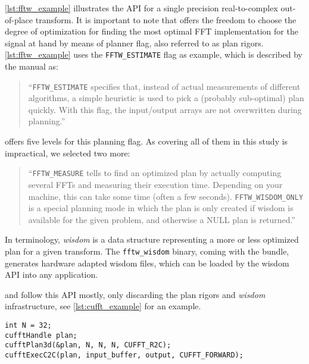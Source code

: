 \cref{lst:fftw_example} illustrates the \fftw{} API for a single precision real-to-complex out-of-place transform. It is important to note that \fftw{} offers the freedom to choose the degree of optimization for finding the most optimal FFT implementation for the signal at hand by means of planner flag, also referred to as plan rigors. \cref{lst:fftw_example} uses the \texttt{FFTW\_ESTIMATE} flag as example, which is described by the \fftw{} manual \cite{fftw_manual} as:
%
\begin{quote}
``\texttt{FFTW\_ESTIMATE} specifies that, instead of actual measurements of different algorithms, a simple heuristic is used to pick a (probably sub-optimal) plan quickly. With this flag, the input/output arrays are not overwritten during planning.''
\end{quote}
%
\fftw{} offers five levels for this planning flag. As covering all of them in this study is impractical, we selected two more:
\begin{quote}
``\texttt{FFTW\_MEASURE} tells \fftw{} to find an optimized plan by actually computing several FFTs and measuring their execution time. Depending on your machine, this can take some time (often a few seconds).\newline
\texttt{FFTW\_WISDOM\_ONLY} is a special planning mode in which the plan is only created if wisdom is available for the given problem, and otherwise a NULL plan is returned.''
\end{quote}
%
In \fftw{} terminology, \emph{wisdom} is a data structure representing a more or less optimized plan for a given transform. The \texttt{fftw\_wisdom} binary, coming with the \fftw{} bundle, generates hardware adapted wisdom files, which can be loaded by the wisdom API into any \fftw{} application.

\cufft{} and \clfft{} follow this API mostly, only discarding the plan rigors and \emph{wisdom} infrastructure, see \cref{lst:cufft_example} for an example.

\begin{lstlisting}[caption={Minimal usage example of the \cufft{} single precision real-to-complex planner API. Memory management is omitted.},label={lst:cufft_example}]
int N = 32;
cufftHandle plan;
cufftPlan3d(&plan, N, N, N, CUFFT_R2C);
cufftExecC2C(plan, input_buffer, output, CUFFT_FORWARD);
\end{lstlisting}
%
